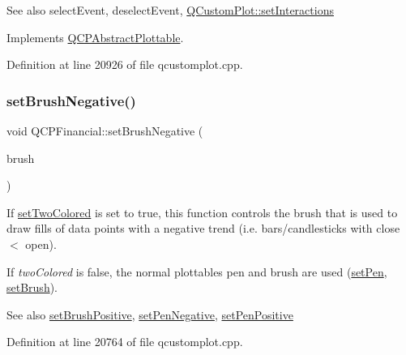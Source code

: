 \begin{DoxySeeAlso}{See also}
select\+Event, deselect\+Event, \hyperlink{class_q_custom_plot_a5ee1e2f6ae27419deca53e75907c27e5}{Q\+Custom\+Plot\+::set\+Interactions} 
\end{DoxySeeAlso}


Implements \hyperlink{class_q_c_p_abstract_plottable_a38efe9641d972992a3d44204bc80ec1d}{Q\+C\+P\+Abstract\+Plottable}.



Definition at line 20926 of file qcustomplot.\+cpp.

\mbox{\label{class_q_c_p_financial_a8bbdd87629f9144b3ef51af660c0961a}} 
\subsubsection{\texorpdfstring{set\+Brush\+Negative()}{setBrushNegative()}}
{\footnotesize\ttfamily void Q\+C\+P\+Financial\+::set\+Brush\+Negative (\begin{DoxyParamCaption}\item[{const Q\+Brush \&}]{brush }\end{DoxyParamCaption})}

If \hyperlink{class_q_c_p_financial_a138e44aac160a17a9676652e240c5f08}{set\+Two\+Colored} is set to true, this function controls the brush that is used to draw fills of data points with a negative trend (i.\+e. bars/candlesticks with close $<$ open).

If {\itshape two\+Colored} is false, the normal plottable\textquotesingle{}s pen and brush are used (\hyperlink{class_q_c_p_abstract_plottable_ab74b09ae4c0e7e13142fe4b5bf46cac7}{set\+Pen}, \hyperlink{class_q_c_p_abstract_plottable_a7a4b92144dca6453a1f0f210e27edc74}{set\+Brush}).

\begin{DoxySeeAlso}{See also}
\hyperlink{class_q_c_p_financial_a5ebff2b1764efd07cc44942e67821829}{set\+Brush\+Positive}, \hyperlink{class_q_c_p_financial_afe5c07e94ccea01a75b3a2476993c346}{set\+Pen\+Negative}, \hyperlink{class_q_c_p_financial_ac58aa3adc7a35aab0088764b840683e5}{set\+Pen\+Positive} 
\end{DoxySeeAlso}


Definition at line 20764 of file qcustomplot.\+cpp.


